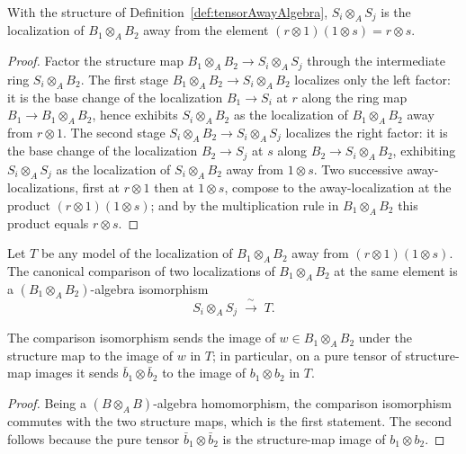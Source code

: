 \begin{theorem}
  \label{thm:isLocalization_away_tensor}
  \leanok
  With the structure of Definition~\ref{def:tensorAwayAlgebra}, \(S_i \otimes_A S_j\) is the
  localization of \(B_1 \otimes_A B_2\) away from the element
  \((r \otimes 1)(1 \otimes s) = r \otimes s\).
\end{theorem}
\begin{proof}
  \leanok
  Factor the structure map \(B_1 \otimes_A B_2 \to S_i \otimes_A S_j\) through the intermediate
  ring \(S_i \otimes_A B_2\). The first stage \(B_1 \otimes_A B_2 \to S_i \otimes_A B_2\)
  localizes only the left factor: it is the base change of the localization \(B_1 \to S_i\) at
  \(r\) along the ring map \(B_1 \to B_1 \otimes_A B_2\), hence exhibits \(S_i \otimes_A B_2\) as
  the localization of \(B_1 \otimes_A B_2\) away from \(r \otimes 1\). The second stage
  \(S_i \otimes_A B_2 \to S_i \otimes_A S_j\) localizes the right factor: it is the base change of
  the localization \(B_2 \to S_j\) at \(s\) along \(B_2 \to S_i \otimes_A B_2\), exhibiting
  \(S_i \otimes_A S_j\) as the localization of \(S_i \otimes_A B_2\) away from \(1 \otimes s\).
  Two successive away-localizations, first at \(r \otimes 1\) then at \(1 \otimes s\), compose
  to the away-localization at the product \((r \otimes 1)(1 \otimes s)\); and by the
  multiplication rule in \(B_1 \otimes_A B_2\) this product equals \(r \otimes s\).
\end{proof}

\begin{definition}
  \label{def:tensorAwayEquiv}
  \leanok
  Let \(T\) be any model of the localization of \(B_1 \otimes_A B_2\) away from
  \((r \otimes 1)(1 \otimes s)\). The canonical comparison of two localizations of
  \(B_1 \otimes_A B_2\) at the same element is a \((B_1 \otimes_A B_2)\)-algebra isomorphism
  \[
    S_i \otimes_A S_j \;\xrightarrow{\ \sim\ }\; T .
  \]
\end{definition}

\begin{lemma}
  \label{lem:tensorAwayEquiv_tmul}
  \leanok
  The comparison isomorphism sends the image of \(w \in B_1 \otimes_A B_2\) under the structure
  map to the image of \(w\) in \(T\); in particular, on a pure tensor of structure-map images it
  sends \(\bar b_1 \otimes \bar b_2\) to the image of \(b_1 \otimes b_2\) in \(T\).
\end{lemma}
\begin{proof}
  \leanok
  Being a \((B \otimes_A B)\)-algebra homomorphism, the comparison isomorphism commutes with the
  two structure maps, which is the first statement. The second follows because the pure tensor
  \(\bar b_1 \otimes \bar b_2\) is the structure-map image of \(b_1 \otimes b_2\).
\end{proof}

